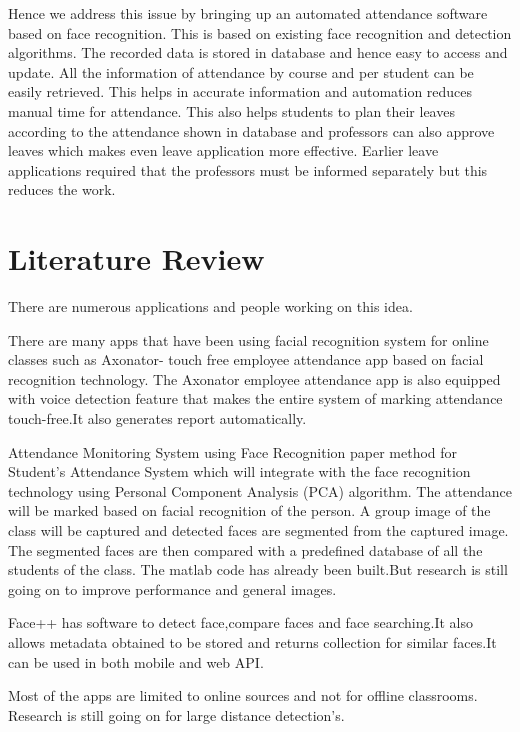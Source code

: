 \documentclass[10pt,twocolumn,letterpaper]{article}
\begin{document}
Hence we address this issue by bringing up an automated attendance software based on face recognition. This is based on existing face recognition and detection algorithms. The recorded data is stored in database and hence easy to access and update. All the information of attendance by course and per student can be easily retrieved. This helps in accurate information and automation reduces manual time for attendance. This also helps students to plan their leaves according to the attendance shown in database and professors can also approve leaves which makes even leave application more effective. Earlier leave applications required that the professors must be informed separately but this reduces the work.



\section{Literature Review}

There are numerous applications and people working on this idea.



There are many apps that have been using facial recognition system for online classes such as Axonator- touch free employee attendance app based on facial recognition technology. The Axonator employee attendance app is also equipped with voice detection feature that makes the entire system of marking attendance touch-free.It also generates report automatically.

Attendance Monitoring System using Face Recognition paper 
method for Student’s Attendance System which will integrate
with the face recognition technology using Personal
Component Analysis (PCA) algorithm. The attendance will be
marked based on facial recognition of the person. A group
image of the class will be captured and detected faces are
segmented from the captured image. The segmented faces are
then compared with a predefined database of all the students
of the class. The matlab code has already been built.But research is still going on to improve performance and general images.~\cite{software}

Face++ has software to detect face,compare faces and face searching.It also allows metadata obtained to be stored and returns collection for similar faces.It can be used in both mobile and web API.~\cite{face++}

Most of the apps are limited to online sources and not for offline classrooms. Research is still going on for large distance detection's.
\end{document}
